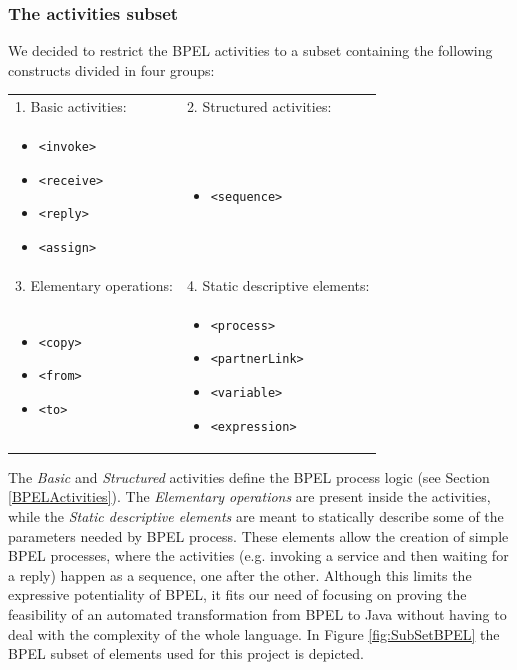 \subsubsection{The activities subset}
\label{sec:actvitiesSubset}
We decided to restrict the BPEL activities to a subset containing the following constructs divided in four groups:
\begin{center}
\begin{supertabular}{p{0.4\textwidth}p{0.4\textwidth}}

1. Basic activities: 			& 2. Structured activities:		\\
\begin{itemize}
	\item \verb|<invoke>|
	\item \verb|<receive>|
	\item \verb|<reply>|
	\item \verb|<assign>|
	\end{itemize} 			&

					    \begin{itemize}
					      \item \verb|<sequence>|
					     \end{itemize}			\\
					     
3. Elementary operations: 		& 4. Static descriptive elements:	\\					
\begin{itemize}
	\item \verb|<copy>|
	\item \verb|<from>|
	\item \verb|<to>|
  \end{itemize} &

					    \begin{itemize}
					      \item \verb|<process>|
					      \item \verb|<partnerLink>|
					      \item \verb|<variable>|
					      \item \verb|<expression>|
					    \end{itemize}\\
\end{supertabular}
\end{center}

The \textit{Basic} and \textit{Structured} activities define the BPEL process logic (see Section \ref{BPELActivities}). The \textit{Elementary operations} are present inside the activities, while the \textit{Static descriptive elements} are meant to statically describe some of the parameters needed by BPEL process.
These elements allow the creation of simple BPEL processes, where the activities (e.g. invoking a service and then waiting for a reply) happen as a sequence, one after the other. Although this limits the expressive potentiality of BPEL, it fits our need of focusing on proving the feasibility of an automated transformation from BPEL to Java without having to deal with the complexity of the whole language.
In Figure \ref{fig:SubSetBPEL} the BPEL subset of elements used for this project is depicted.

